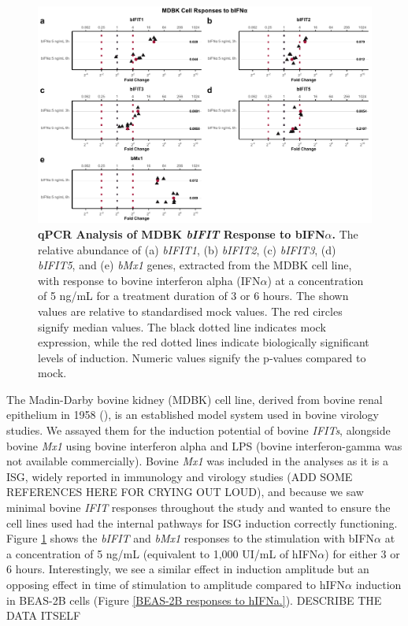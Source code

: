 \begin{figure}
    \centering
    \includegraphics[width=1\linewidth]{07. Chapter 2/Figs/02. Induction/01. mdbk_treat_bifna.pdf}
    \caption[qPCR Analysis of MDBK \textit{bIFIT} Response to bIFN\(\alpha\).]{\textbf{qPCR Analysis of MDBK \textit{bIFIT} Response to bIFN\(\alpha\).} The relative abundance of (a) \textit{bIFIT1}, (b) \textit{bIFIT2}, (c) \textit{bIFIT3}, (d) \textit{bIFIT5}, and (e) \textit{bMx1} genes, extracted from the MDBK cell line, with response to bovine interferon alpha (IFN\(\alpha\)) at a concentration of 5 ng/mL for a treatment duration of 3 or 6 hours. The shown values are relative to standardised mock values. The red circles signify median values. The black dotted line indicates mock expression, while the red dotted lines indicate biologically significant levels of induction. Numeric values signify the p-values compared to mock.}
    \label{MDBK responses to bIFNa}
\end{figure}

The Madin-Darby bovine kidney (MDBK) cell line, derived from bovine renal epithelium in 1958 (\cite{Madin1958EstablishedOrigin}), is an established model system used in bovine virology studies. We assayed them for the induction potential of bovine \textit{IFITs}, alongside bovine \textit{Mx1} using bovine interferon alpha and LPS (bovine interferon-gamma was not available commercially). Bovine \textit{Mx1} was included in the analyses as it is a ISG, widely reported in immunology and virology studies (ADD SOME REFERENCES HERE FOR CRYING OUT LOUD), and because we saw minimal bovine \textit{IFIT} responses throughout the study and wanted to ensure the cell lines used had the internal pathways for ISG induction correctly functioning. Figure \ref{MDBK responses to bIFNa} shows the \textit{bIFIT} and \textit{bMx1} responses to the stimulation with bIFN\(\alpha\) at a concentration of 5 ng/mL (equivalent to 1,000 UI/mL of hIFN\(\alpha\)) for either 3 or 6 hours. Interestingly, we see a similar effect in induction amplitude but an opposing effect in time of stimulation to amplitude compared to hIFN\(\alpha\) induction in BEAS-2B cells (Figure \ref{BEAS-2B responses to hIFNa.}). DESCRIBE THE DATA ITSELF


